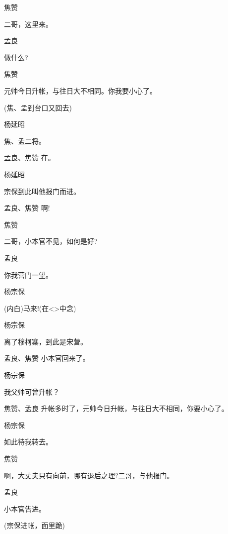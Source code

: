 {焦赞\hspace{30pt}~

二哥，这里来。

孟良\hspace{30pt}~

做什么?

焦赞\hspace{30pt}~

元帅今日升帐，与往日大不相同。你我要小心了。

(焦、孟到台口又回去)

杨延昭\hspace{20pt}~

焦、孟二将。

孟良、焦赞 在。

杨延昭\hspace{20pt}~

宗保到此叫他报门而进。

孟良、焦赞 啊!

焦赞\hspace{30pt}~

二哥，小本官不见，如何是好?

孟良\hspace{30pt}~

你我营门一望。

杨宗保\hspace{20pt}~

({\akai 内}白)马来!(在\textless{}\!\textgreater{}中念)

杨宗保\hspace{20pt}~

离了穆柯寨，到此是宋营。

孟良、焦赞 小本官回来了。

杨宗保\hspace{20pt}~

我父帅可曾升帐？

焦赞、孟良 升帐多时了，元帅今日升帐，与往日大不相同，你要小心了。

杨宗保\hspace{20pt}~

如此待我转去。

焦赞\hspace{30pt}~

啊，大丈夫只有向前，哪有退后之理?二哥，与他报门。

孟良\hspace{30pt}~

小本官告进。

(宗保进帐，面里跪)

}
